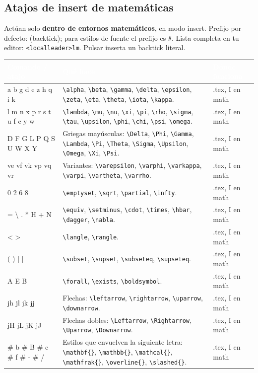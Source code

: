 \documentclass[8pt,a4paper,landscape]{extarticle}
\newcommand{\kk}[1]{\texttt{#1}}
\newcommand{\lld}{\texttt{<localleader>}}
\newcommand{\bs}{\textbackslash{}}
\newcommand{\bt}{\textasciigrave{}}
\newenvironment{cht}{%
  \begin{longtable}{>{\raggedright\arraybackslash\ttfamily}p{0.27\textwidth}
                    >{\raggedright\arraybackslash}p{0.46\textwidth}
                    >{\raggedright\arraybackslash}p{0.21\textwidth}}
  \rowcolor{accent}\textcolor{white}{\textbf{\rmfamily Comando / atajo}} &
  \textcolor{white}{\textbf{Qué hace}} & \textcolor{white}{\textbf{Dónde funciona}} \\
  \endhead
}{\end{longtable}}
\newcommand{\rr}[3]{#1 & #2 & #3 \\}
\newcommand{\rg}[3]{\rowcolor{rowgray}\relax #1 & #2 & #3 \\}
\let\oldsubsection\subsection
\renewcommand{\subsection}{\Needspace{9\baselineskip}\oldsubsection}
\begin{document}
\subsection{Atajos de insert de matemáticas}
Actúan solo \textbf{dentro de entornos matemáticos}, en modo insert. Prefijo por defecto: \kk{\bt} (backtick); para estilos de fuente el prefijo es \kk{\#}. Lista completa en tu editor: \kk{\lld lm}. Pulsar \kk{\bt\bt} inserta un backtick literal.
\begin{cht}
\rg{\bt a \bt b \bt g \bt d \bt e \bt z \bt h \bt q \bt i \bt k}{\kk{\bs alpha}, \kk{\bs beta}, \kk{\bs gamma}, \kk{\bs delta}, \kk{\bs epsilon}, \kk{\bs zeta}, \kk{\bs eta}, \kk{\bs theta}, \kk{\bs iota}, \kk{\bs kappa}.}{.tex, I en math}
\rr{\bt l \bt m \bt n \bt x \bt p \bt r \bt s \bt t \bt u \bt f \bt c \bt y \bt w}{\kk{\bs lambda}, \kk{\bs mu}, \kk{\bs nu}, \kk{\bs xi}, \kk{\bs pi}, \kk{\bs rho}, \kk{\bs sigma}, \kk{\bs tau}, \kk{\bs upsilon}, \kk{\bs phi}, \kk{\bs chi}, \kk{\bs psi}, \kk{\bs omega}.}{.tex, I en math}
\rg{\bt D \bt F \bt G \bt L \bt P \bt Q \bt S \bt U \bt W \bt X \bt Y}{Griegas mayúsculas: \kk{\bs Delta}, \kk{\bs Phi}, \kk{\bs Gamma}, \kk{\bs Lambda}, \kk{\bs Pi}, \kk{\bs Theta}, \kk{\bs Sigma}, \kk{\bs Upsilon}, \kk{\bs Omega}, \kk{\bs Xi}, \kk{\bs Psi}.}{.tex, I en math}
\rr{\bt ve \bt vf \bt vk \bt vp \bt vq \bt vr}{Variantes: \kk{\bs varepsilon}, \kk{\bs varphi}, \kk{\bs varkappa}, \kk{\bs varpi}, \kk{\bs vartheta}, \kk{\bs varrho}.}{.tex, I en math}
\rg{\bt 0 \bt 2 \bt 6 \bt 8}{\kk{\bs emptyset}, \kk{\bs sqrt}, \kk{\bs partial}, \kk{\bs infty}.}{.tex, I en math}
\rr{\bt = \bt \bs{} \bt . \bt * \bt H \bt + \bt N}{\kk{\bs equiv}, \kk{\bs setminus}, \kk{\bs cdot}, \kk{\bs times}, \kk{\bs hbar}, \kk{\bs dagger}, \kk{\bs nabla}.}{.tex, I en math}
\rg{\bt < \bt >}{\kk{\bs langle}, \kk{\bs rangle}.}{.tex, I en math}
\rr{\bt ( \bt ) \bt [ \bt ]}{\kk{\bs subset}, \kk{\bs supset}, \kk{\bs subseteq}, \kk{\bs supseteq}.}{.tex, I en math}
\rg{\bt A \bt E \bt B}{\kk{\bs forall}, \kk{\bs exists}, \kk{\bs boldsymbol}.}{.tex, I en math}
\rr{\bt jh \bt jl \bt jk \bt jj}{Flechas: \kk{\bs leftarrow}, \kk{\bs rightarrow}, \kk{\bs uparrow}, \kk{\bs downarrow}.}{.tex, I en math}
\rg{\bt jH \bt jL \bt jK \bt jJ}{Flechas dobles: \kk{\bs Leftarrow}, \kk{\bs Rightarrow}, \kk{\bs Uparrow}, \kk{\bs Downarrow}.}{.tex, I en math}
\rr{\# b \# B \# c \# f \# - \# /}{Estilos que envuelven la siguiente letra: \kk{\bs mathbf\{\}}, \kk{\bs mathbb\{\}}, \kk{\bs mathcal\{\}}, \kk{\bs mathfrak\{\}}, \kk{\bs overline\{\}}, \kk{\bs slashed\{\}}.}{.tex, I en math}
\end{cht}
\end{document}
